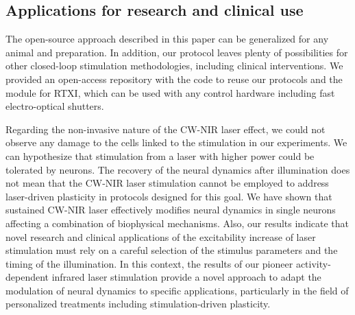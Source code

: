 \subsection{Applications for research and clinical use}
The open-source approach described in this paper can be generalized for any animal and preparation. In addition, our protocol leaves plenty of possibilities for other closed-loop stimulation methodologies, including clinical interventions. We provided an open-access repository with the code to reuse our protocols and the module for RTXI, which can be used with any control hardware including fast electro-optical shutters. 


Regarding the non-invasive nature of the CW-NIR laser effect, we could not observe any damage to the cells linked to the stimulation in our experiments. We can hypothesize that stimulation from a laser with higher power could be tolerated by neurons. The recovery of the neural dynamics after illumination does not mean that the CW-NIR laser stimulation cannot be employed to address laser-driven plasticity in protocols designed for this goal. We have shown that sustained CW-NIR laser effectively modifies neural dynamics in single neurons affecting a combination of biophysical mechanisms. Also, our results indicate that novel research and clinical applications of the excitability increase of laser stimulation must rely on a careful selection of the stimulus parameters and the timing of the illumination. In this context, the results of our pioneer activity-dependent infrared laser stimulation provide a novel approach to adapt the modulation of neural dynamics to specific applications, particularly in the field of personalized treatments including stimulation-driven plasticity.


